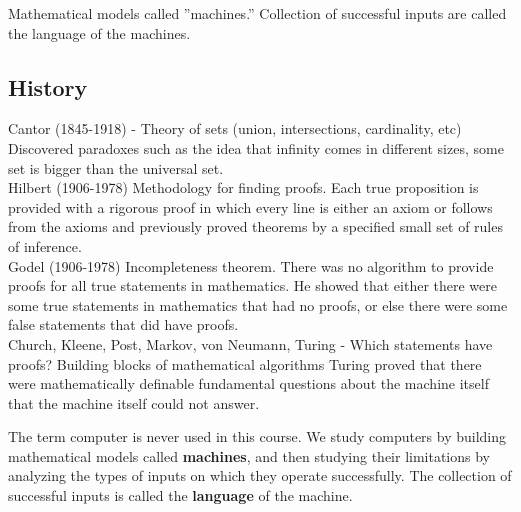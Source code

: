 Mathematical models called ''machines.''
Collection of successful inputs are called the language of the machines.

\subsection{History}
Cantor (1845-1918) - Theory of sets (union, intersections, cardinality, etc) Discovered paradoxes such as the idea that infinity comes in different sizes, some set is bigger than the universal set.\\
Hilbert (1906-1978) Methodology for finding proofs. Each true proposition is provided with a rigorous proof in which every line is either an axiom or follows from the axioms and previously proved theorems by a specified small set of rules of inference.\\
Godel (1906-1978) Incompleteness theorem. There was no algorithm to provide proofs for all true statements in mathematics. He showed that either there were some true statements in mathematics that had no proofs, or else there were some false statements that did have proofs.\\
    Church, Kleene, Post, Markov, von Neumann, Turing - Which statements have proofs? Building blocks of mathematical algorithms
Turing proved that there were mathematically definable fundamental questions about the machine itself that the machine itself could not answer.


The term computer is never used in this course. We study computers by building mathematical models called \textbf{machines}, and then studying their limitations by analyzing the types of inputs on which they operate successfully. The collection of successful inputs is called the \textbf{language} of the machine.